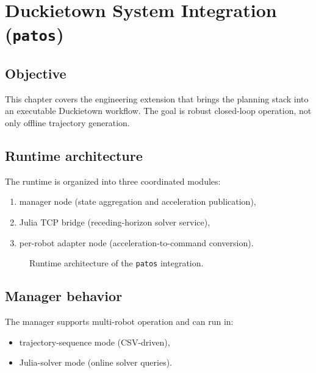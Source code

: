 \chapter{Duckietown System Integration (\texttt{patos})}

\section{Objective}

This chapter covers the engineering extension that brings the planning stack
into an executable Duckietown workflow. The goal is robust closed-loop operation,
not only offline trajectory generation.

\section{Runtime architecture}

The runtime is organized into three coordinated modules:

\begin{enumerate}
    \item manager node (state aggregation and acceleration publication),
    \item Julia TCP bridge (receding-horizon solver service),
    \item per-robot adapter node (acceleration-to-command conversion).
\end{enumerate}

\begin{figure}[tbp]
    \centering
    \caption{Runtime architecture of the \texttt{patos} integration.}
    \label{fig:patos_runtime_arch}
\end{figure}

\section{Manager behavior}

The manager supports multi-robot operation and can run in:

\begin{itemize}
    \item trajectory-sequence mode (CSV-driven),
    \item Julia-solver mode (online solver queries).
\end{itemize}

